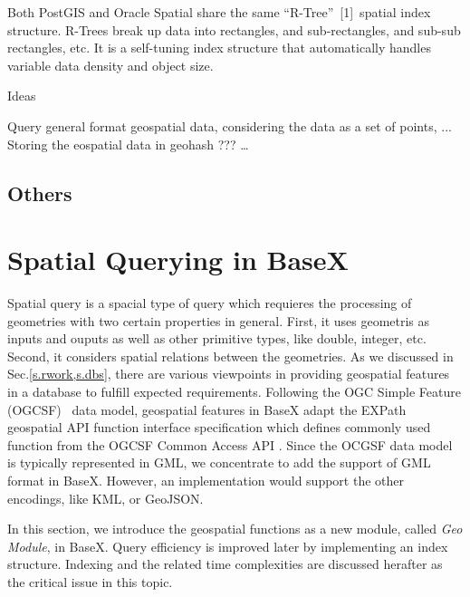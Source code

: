 \documentclass[a4paper,12pt]{article}
\begin{document}
Both PostGIS and Oracle Spatial share the same “R-Tree” [1] spatial index structure. R-Trees break up data into rectangles, and sub-rectangles, and sub-sub rectangles, etc. It is a self-tuning index structure that automatically handles variable data density and object size.

Ideas

Query general format geospatial data, considering the data as a set of points, ...
Storing the eospatial data in geohash ???
…


\subsection{Others}
\newpage

















\section{Spatial Querying in BaseX}
\label{s.basex}
Spatial query is a spacial type of query which requieres the processing of geometries with two certain properties in general. First, it uses geometris as inputs and ouputs as well as other primitive types, like double, integer, etc. Second, it considers spatial relations between the geometries.
As we discussed in Sec.\ref{s.rwork,s.dbs}, there are various viewpoints in providing geospatial features in a database to fulfill expected requirements. Following the OGC Simple Feature (OGCSF)~\cite{springergeo} data model, geospatial features in BaseX adapt the EXPath geospatial API function interface specification which defines commonly used function from the OGCSF Common Access API \cite{simpleFeature}. Since the OCGSF data model is typically represented in GML, we concentrate to add the support of GML format in BaseX. However, an implementation would support the other encodings, like KML, or GeoJSON. 

In this section, we introduce the geospatial functions as a new module, called \textit{Geo Module}, in BaseX. Query efficiency is improved later by implementing an index structure. Indexing and the related time complexities are discussed herafter as the critical issue in this topic.
\end{document}

